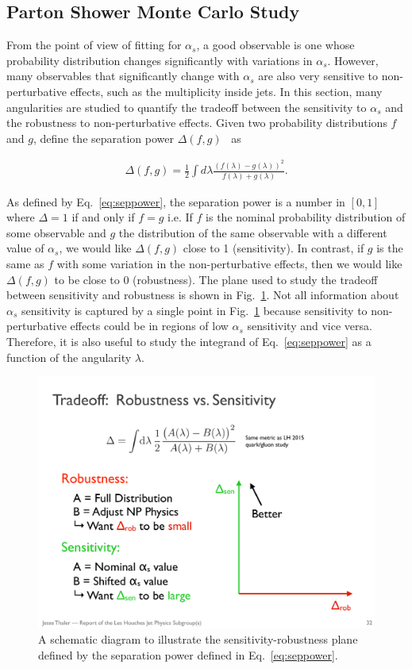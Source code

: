 \subsection{Parton Shower Monte Carlo Study}

From the point of view of fitting for $\alpha_s$, a good observable is one whose probability distribution changes significantly with variations in $\alpha_s$.  However, many observables that significantly change with $\alpha_s$ are also very sensitive to non-perturbative effects, such as the multiplicity inside jets.  In this section, many angularities are studied to quantify the tradeoff between the sensitivity to $\alpha_s$ and the robustness to non-perturbative effects.  Given two probability distributions $f$ and $g$, define the separation power $\Delta(f,g)$~\cite{Harrison:1998yr} as

\begin{align}
\label{eq:seppower}
\Delta(f,g)=\frac{1}{2}\int d\lambda \frac{(f(\lambda)-g(\lambda))^2}{f(\lambda)+g(\lambda)}.
\end{align}

\noindent As defined by Eq.~\ref{eq:seppower}, the separation power is
a number in $[0,1]$ where $\Delta=1$  if and only if $f=g$ i.e.  If $f$ is the nominal probability distribution of some observable and $g$ the distribution of the same observable with a different value of $\alpha_s$, we would like $\Delta(f,g)$ close to 1 (sensitivity).  In contrast, if $g$ is the same as $f$ with some variation in the non-perturbative effects, then we would like $\Delta(f,g)$ to be close to $0$ (robustness).  The plane used to study the tradeoff between sensitivity and robustness is shown in Fig.~\ref{fig:robustnessschematic}.  Not all information about $\alpha_s$ sensitivity is captured by a single point in Fig.~\ref{fig:robustnessschematic} because sensitivity to non-perturbative effects could be in regions of low $\alpha_s$ sensitivity and vice versa.  Therefore, it is also useful to study the integrand of Eq.~\ref{eq:seppower} as a function of the angularity $\lambda$.

\begin{figure}[h!]
\begin{center}
\includegraphics[width = 0.4\columnwidth]{figures/robustnessschematic.pdf}
\end{center}
\caption{A schematic diagram to illustrate the sensitivity-robustness plane defined by the separation power defined in Eq.~\ref{eq:seppower}.}
\label{fig:robustnessschematic}
\end{figure}

